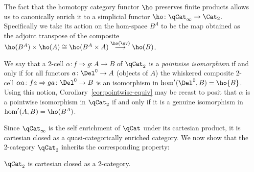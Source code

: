\begin{defn}
  The fact that the homotopy category functor $\ho$ preserves finite products allows us to canonically enrich it to a simplicial functor $\ho\colon\qCat_\infty\to\Cat_2$. Specifically we take its action on the hom-space $B^A$ to be the map obtained as the adjoint transpose of the composite $\ho(B^A)\times\ho(A)\cong\ho(B^A\times A)\stackrel{\ho(\ev)}\longrightarrow\ho(B)$.
\end{defn}

\begin{obs}\label{obs:pointwise-iso-reprise}
  We say that a 2-cell $\alpha\colon f\Rightarrow g\colon A\to B$ of $\qCat_2$ is a {\em pointwise isomorphism\/} if and only if for all functors $a\colon \Del^0\to A$ (objects of $A$) the whiskered composite 2-cell $\alpha a \colon fa\Rightarrow ga\colon\Del^0\to B$ is an isomorphism in $\hom'(\Del^0, B) = \ho{B}$. Using this notion, Corollary~\ref{cor:pointwise-equiv} may be recast to posit that $\alpha$ is a pointwise isomorphism in $\qCat_2$ if and only if it is a genuine isomorphism in $\hom'(A,B)=\ho(B^A)$.
\end{obs}

Since $\qCat_\infty$ is the self enrichment of $\qCat$ under its cartesian product,  it is cartesian closed as a quasi-categorically enriched category. We now show that the 2-category $\qCat_2$ inherits the corresponding property:

\begin{prop}\label{prop:qcat2closed} $\qCat_2$ is cartesian closed as a 2-category.
\end{prop}

